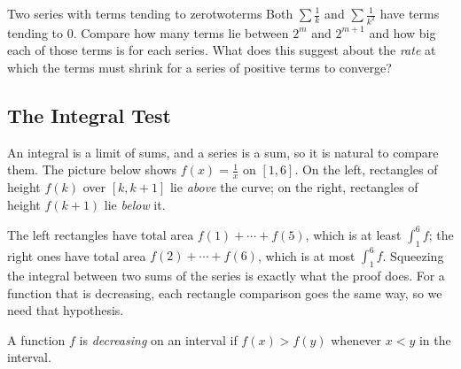 \documentclass[11pt]{article}
\begin{document}
\begin{think}{Two series with terms tending to zero}{twoterms}
Both $\sum\frac1k$ and $\sum\frac1{k^2}$ have terms tending to $0$. Compare how many terms lie between $2^m$ and $2^{m+1}$ and how big each of those terms is for each series. What does this suggest about the \emph{rate} at which the terms must shrink for a series of positive terms to converge?
\end{think}

\subsection*{The Integral Test}

An integral is a limit of sums, and a series is a sum, so it is natural to compare them. The picture below shows $f(x)=\frac1x$ on $[1,6]$. On the left, rectangles of height $f(k)$ over $[k,k+1]$ lie \emph{above} the curve; on the right, rectangles of height $f(k+1)$ lie \emph{below} it.

\begin{center}
\end{center}

The left rectangles have total area $f(1)+\cdots+f(5)$, which is at least $\int_1^6f$; the right ones have total area $f(2)+\cdots+f(6)$, which is at most $\int_1^6f$. Squeezing the integral between two sums of the series is exactly what the proof does. For a function that is decreasing, each rectangle comparison goes the same way, so we need that hypothesis.

A function $f$ is \emph{decreasing} on an interval if $f(x)>f(y)$ whenever $x<y$ in the interval.
\end{document}
